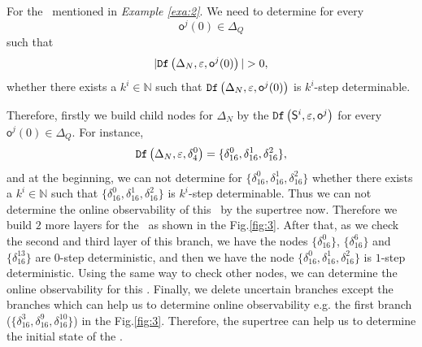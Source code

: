 \begin{example}
For the \BCN\ mentioned in {\em Example \ref{exa:2}}. We need to determine for every \[\mathsf{o}^{j}(0)\in \Delta_Q\] such that \[|\Ded\left(\Delta_N,\varepsilon, \mathsf{o}^{j}(0)\right)|> 0,\] whether there exists a $k^{i}\in \mathbb{N}$ such that ${\tt Df}\left(\Delta_N,\varepsilon,\mathsf{o}^{j}(0)\right)$ is $k^{i}$-step determinable.

Therefore, firstly we build child nodes for $\Delta_N$ by the ${\tt Df}\left(\mathsf{S}^i,\varepsilon, \mathsf{o}^j\right)$ for every $\mathsf{o}^{j}(0)\in \Delta_Q$. For instance, \[{\tt Df}\left(\Delta_N,\varepsilon,\delta_{4}^0\right)=\{\delta_{16}^0,\delta_{16}^1,\delta_{16}^2\},\] and at the beginning, we can not determine for $\{\delta_{16}^0,\delta_{16}^1,\delta_{16}^2\}$ whether there exists a $k^{i}\in \mathbb{N}$ such that $\{\delta_{16}^0,\delta_{16}^1,\delta_{16}^2\}$ is $k^{i}$-step determinable. Thus we can not determine the online observability of this \BCN\ by the supertree now. Therefore we build $2$ more layers for the \BCN\ as shown in the Fig.\ref{fig:3}. After that, as we check the second and third layer of this branch, we have the nodes $\{\delta_{16}^0\}$, $\{\delta_{16}^6\}$ and $\{\delta_{16}^{13}\}$ are $0$-step deterministic, and then we have the node $\{\delta_{16}^0,\delta_{16}^1,\delta_{16}^2\}$ is $1$-step deterministic. Using the same way to check other nodes, we can determine the online observability for this \BCN. Finally, we delete uncertain branches except the branches which can help us to determine online observability e.g. the first branch ($\{\delta_{16}^{3},\delta_{16}^{9},\delta_{16}^{10}\}$) in the Fig.\ref{fig:3}. Therefore, the supertree can help us to determine the initial state of the \BCN.%
\label{exa:11}
\end{example}   

